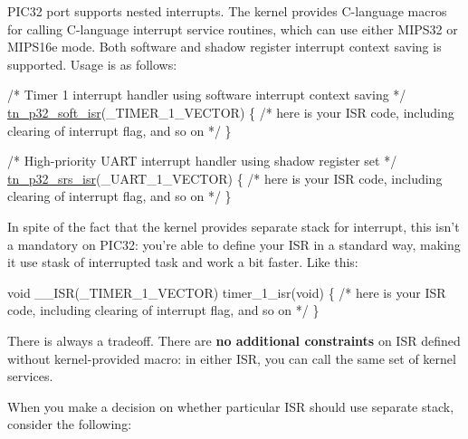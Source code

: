 P\+I\+C32 port supports nested interrupts. The kernel provides C-\/language macros for calling C-\/language interrupt service routines, which can use either M\+I\+P\+S32 or M\+I\+P\+S16e mode. Both software and shadow register interrupt context saving is supported. Usage is as follows\+:


\begin{DoxyCode}
\textcolor{comment}{/* Timer 1 interrupt handler using software interrupt context saving */}
\hyperlink{tn__arch__pic32_8h_a02d853d8d573f928fb8da65ef0c2bc8e}{tn\_p32\_soft\_isr}(\_TIMER\_1\_VECTOR)
\{
   \textcolor{comment}{/* here is your ISR code, including clearing of interrupt flag, and so on */}
\}

\textcolor{comment}{/* High-priority UART interrupt handler using shadow register set */}
\hyperlink{tn__arch__pic32_8h_a523bb667617e6bb6f68a8f85855030a5}{tn\_p32\_srs\_isr}(\_UART\_1\_VECTOR)
\{
   \textcolor{comment}{/* here is your ISR code, including clearing of interrupt flag, and so on */}
\}
\end{DoxyCode}


In spite of the fact that the kernel provides separate stack for interrupt, this isn't a mandatory on P\+I\+C32\+: you're able to define your I\+S\+R in a standard way, making it use stask of interrupted task and work a bit faster. Like this\+:


\begin{DoxyCode}
\textcolor{keywordtype}{void} \_\_ISR(\_TIMER\_1\_VECTOR) timer\_1\_isr(\textcolor{keywordtype}{void})
\{
   \textcolor{comment}{/* here is your ISR code, including clearing of interrupt flag, and so on */}
\}
\end{DoxyCode}


There is always a tradeoff. There are {\bfseries no additional constraints} on I\+S\+R defined without kernel-\/provided macro\+: in either I\+S\+R, you can call the same set of kernel services.

When you make a decision on whether particular I\+S\+R should use separate stack, consider the following\+:


